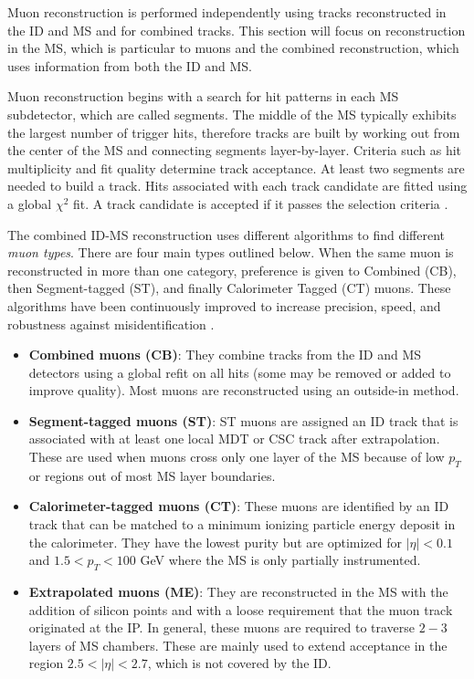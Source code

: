 Muon reconstruction is performed independently using tracks reconstructed in the ID and MS and for combined tracks. This section will focus on reconstruction in the MS, which is particular to muons and the combined reconstruction, which uses information from both the ID and MS. 

Muon reconstruction begins with a search for hit patterns in each MS subdetector, which are called segments. The middle of the MS typically exhibits the largest number of trigger hits, therefore tracks are built by working out from the center of the MS and connecting segments layer-by-layer. Criteria such as hit multiplicity and fit quality determine track acceptance. At least two segments are needed to build a track. Hits associated with each track candidate are fitted using a global $\chi^2$ fit. A track candidate is accepted if it passes the selection criteria \cite{IDreconstruction}. 

The combined ID-MS reconstruction uses different algorithms to find different \textit{muon types}. There are four main types outlined below. When the same muon is reconstructed in more than one category, preference is given to Combined (CB), then Segment-tagged (ST), and finally Calorimeter Tagged (CT) muons. These algorithms have been continuously improved to increase precision, speed, and robustness against misidentification \cite{MCPpaper}.  

\begin{itemize}
\item \textbf{Combined muons (CB)}: They combine tracks from the ID and MS detectors using a global refit on all hits (some may be removed or added to improve quality). Most muons are reconstructed using an outside-in method. 
\item \textbf{Segment-tagged muons (ST)}: ST muons are assigned an ID track that is associated with at least one local MDT or CSC track after extrapolation. These are used when muons cross only one layer of the MS because of low $p_T$ or regions out of most MS layer boundaries. 
\item \textbf{Calorimeter-tagged muons (CT)}: These muons are identified by an ID track that can be matched to a minimum ionizing particle energy deposit in the calorimeter. They have the lowest purity but are optimized for $|\eta|  < 0.1$ and $1.5 < p_T < 100$ GeV where the MS is only partially instrumented. 
\item \textbf{Extrapolated muons (ME)}: They are reconstructed in the MS with the addition of silicon points and with a loose requirement that the muon track originated at the IP. In general, these muons are required to traverse $2-3$ layers of MS chambers. These are mainly used to extend acceptance in the region $2.5 < |\eta| < 2.7$, which is not covered by the ID. 
\end{itemize}

